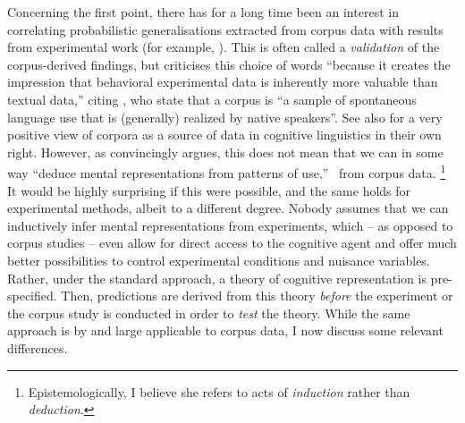 Concerning the first point, there has for a long time been an interest in correlating probabilistic generalisations extracted from corpus data with results from experimental work (for example, \citealp{ArppeJaervikivi2007,BresnanEa2007,BresnanFord2010,DivjakGries2008,DivjakEa2016,FordBresnan2013}).
This is often called a \textit{validation} of the corpus-derived findings, but \citet[303]{Divjak2016a} criticises this choice of words ``because it creates the impression that behavioral experimental data is inherently more valuable than textual data,'' citing \cite{TummersEa2005}, who state that a corpus is ``a sample of spontaneous language use that is (generally) realized by native speakers''.
See also \citet{Newman2011} for a very positive view of corpora as a source of data in cognitive linguistics in their own right.
However, as \citet[486--487]{Dabrowska2016} convincingly argues, this does not mean that we can in some way ``deduce mental representations from patterns of use,'' \ie\ from corpus data.%
\footnote{Epistemologically, I believe she refers to acts of \textit{induction} rather than \textit{deduction}.}
It would be highly surprising if this were possible, and the same holds for experimental methods, albeit to a different degree.
Nobody assumes that we can inductively infer mental representations from experiments, which -- as opposed to corpus studies -- even allow for direct access to the cognitive agent and offer much better possibilities to control experimental conditions and nuisance variables.
Rather, under the standard approach, a theory of cognitive representation is pre-specified.
Then, predictions are derived from this theory \textit{before} the experiment or the corpus study is conducted in order to \textit{test} the theory.
While the same approach is by and large applicable to corpus data, I now discuss some relevant differences.


